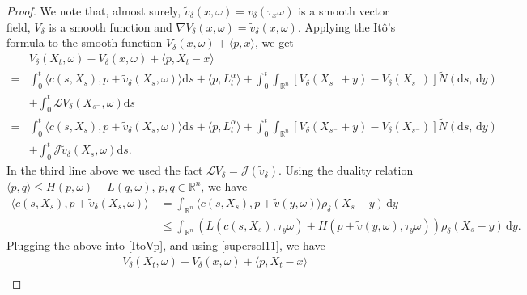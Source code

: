 \documentclass[11pt,reqno]{amsart}
\theoremstyle{definition}
\theoremstyle{remark}
\numberwithin{equation}{section}
\begin{document}
\begin{proof}
We note that, almost surely, $\widetilde{v}_\delta(x,\omega) = v_\delta(\tau_x \omega)$ is a smooth vector field, $V_\delta$ is a smooth function and $\nabla V_{\delta}(x,\omega) = \widetilde{v}_\delta(x,\omega)$. Applying the It\^{o}'s formula to the smooth function $V_\delta(x,\omega)+\langle p,x\rangle$, we get
\begin{align}\label{ItoVp}
     & V_{\delta}(X_{t},\omega) - V_{\delta}(x,\omega) + \langle p, X_{t} - x \rangle \nonumber \\
    =& \int_{0}^{ t} \langle c(s, X_{s}), p+ \widetilde{v}_{\delta}(X_{s}, \omega)\rangle \mathrm{d}s  + \langle p, L^{\alpha}_{t} \rangle + \int_{0}^{t} \int_{\mathbb{R}^n} [V_{\delta}(X_{s^{-}}+ y)-V_{\delta}(X_{s^{-}})]\widetilde{N}(\mathrm{d}s,\,\mathrm{d}y) \nonumber \\
     & +\int_{0}^{t} \mathscr{L} V_{\delta}(X_{s^{-}},\omega)\mathrm{d}s \nonumber \\
     =& \int_{0}^{ t} \langle c(s, X_{s}), p+ \widetilde{v}_{\delta}(X_{s}, \omega)\rangle \mathrm{d}s + \langle p, L^{\alpha}_{t} \rangle + \int_{0}^{t} \int_{\mathbb{R}^n} [V_{\delta}(X_{s^{-}}+ y)-V_{\delta}(X_{s^{-}})]\widetilde{N}(\mathrm{d}s,\,\mathrm{d}y) \nonumber \\
     & + \int^{t}_{0} \mathscr{J} \widetilde{v}_{\delta}(X_{s},\omega)\mathrm{d}s.
\end{align}
In the third line above we used the fact $\mathscr{L} V_\delta = \mathscr{J}( \widetilde{v}_\delta)$. Using the duality relation $ \langle p, q\rangle \leq H(p,\omega) + L(q, \omega)$, $p,q \in\mathbb{R}^n$, we have
\begin{equation}
\label{eq:l54-1}
\begin{aligned}
    \langle c(s, X_{s}), p+ \widetilde{v}_{\delta}(X_{s},\omega)\rangle \
    &=  \int_{\mathbb{R}^n} \langle c(s, X_{s}), p+ \widetilde{v}(y,\omega)\rangle\rho_{\delta}(X_{s}-y)\,\mathrm{d}y \\
    &\leq  \int_{\mathbb{R}^n} (L(c(s, X_{s}), \tau_{y}\omega)+H(p+ \widetilde{v}(y,\omega), \tau_{y}\omega))\rho_{\delta}(X_{s}-y)\,\mathrm{d}y.
\end{aligned}
\end{equation}
Plugging the above into \eqref{ItoVp}, and using \eqref{supersol11}, we have
\begin{equation*}
\begin{aligned}
     & V_{\delta}(X_{t},\omega) - V_{\delta}(x,\omega) + \langle p, X_{t} - x \rangle \nonumber \\

\end{aligned}
\end{equation*}
\end{proof}
\end{document}
